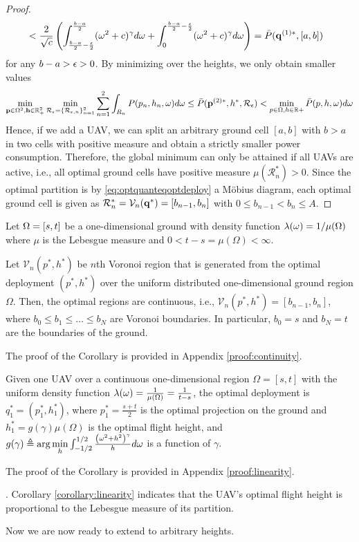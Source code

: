 \documentclass[smallabstract,smallcaptions]{dccpaper}
\newenvironment{remark}{\par\vspace{1.5ex}\noindent{\em Remark\/}.}{\par\vspace{1.5ex}}
\newcommand{\df}{\ensuremath{\lam}}         %
\newcommand{\Pbar}{\ensuremath{\bar{P}}}         %
\newcommand{\Vor}{\ensuremath{\mathcal{V}}}         %
\newcommand{\Rset}{\ensuremath{\mathcal R}}
\newcommand{\junstart}{\color{black}}
\newcommand{\junend}{\color{black}}
\begin{document}
\begin{proof}
\begin{align}
    &< \frac{2}{\sqrt{c}}\left( \int_{\frac{b-a}{2} -\frac{\eps}{2}}^{\frac{b-a}{2}} (\ome^2+c)^{\gam}d\ome
    +\int_{0}^{\frac{b-a}{2}-\frac{\eps}{2}} (\ome^2+c)^{\gam} d\ome\right)=\Pbar(\vq^{(1)*},[a,b])\notag
  \end{align}
  for any $b-a>\epsilon>0$. By minimizing over the heights, we only obtain smaller values
  \begin{align}
    \min_{ \vp\in\Ome^2, \vh\in\R_+^2} \min_{\Rset_{\eps}=\{\Rset_{\eps,n}\}_{n=1}^2}
    \sum_{n=1}^2 \int_{R_n} P(p_n,h_n,\ome)d\ome \leq
    \Pbar(\vp^{(2)*},h^*,\Rset_{\eps}) < \min_{p\in\Ome,h\in\R+} \Pbar(p,h,\ome)d\ome\notag
  \end{align}
  Hence, if we add a UAV, we can split an arbitrary ground cell $[a,b]$ with $b>a$ in two cells with positive measure
  and obtain a strictly smaller power consumption. Therefore, the global minimum can only be attained if all UAVs are
  active, i.e., all optimal ground cells have positive measure $\mu(\Rset^*_n)>0$. Since the optimal partition is by
  \eqref{eq:optquanteqoptdeploy} a Möbius diagram, each optimal ground cell is given as
  $\Rset^*_n=\Vor_n(\vq^*)=[b_{n-1},b_n]$ with $0 \leq b_{n-1}<b_n\leq A$. 
\end{proof}
\fi %
%
\junstart
%
Let $\Omega=[s,t]$ be a one-dimensional ground with density function $\df(\ome)=1/\mu(\Omega)$ where $\mu$ is the Lebesgue
measure and $0<t-s=\mu(\Omega)<\infty$.
%
\begin{corollary}
%
Let $\Vor_n(p^*, h^*)$ be $n$th Voronoi region that is generated from the optimal deployment $(p^*, h^*)$ over the
uniform distributed one-dimensional ground region $\Omega$. Then, the optimal regions are continuous, i.e., $\Vor_n(p^*,
h^*)=[b_{n-1}, b_n]$, where $b_0\le b_1 \le \dots\le b_N$ are Voronoi boundaries. In particular, $b_0 = s$ and $b_N = t$
are the boundaries of the ground.
\label{corollary:continuity}
\end{corollary}
The proof of the Corollary is provided in Appendix \ref{proof:continuity}.

\begin{corollary}
Given one UAV over a continuous one-dimensional region $\Omega=[s,t]$ with the uniform density function
$\lambda(\omega)=\frac{1}{\mu\left(\Omega\right)}=\frac{1}{t-s}$, the optimal deployment is $q^*_1=\left(p^*_1,
h^*_1\right)$, where $p^*_1=\frac{s+t}{2}$ is the optimal projection on the ground and
$h^*_1=g(\gamma)\mu\left(\Omega\right)$ is the optimal flight height, and
$g(\gamma)\triangleq\arg\min\limits_{h}\int_{-1/2}^{1/2} \frac{\left(\omega^2 + h^2\right)^{\gamma}}{h} d\omega$ is a function
of $\gamma$.
\label{corollary:linearity}
\end{corollary}
%
The proof of the Corollary is provided in Appendix \ref{proof:linearity}.
%
\begin{remark}
  Corollary \ref{corollary:linearity} indicates that the UAV's optimal flight height is proportional to the Lebesgue
  measure of its partition.
\end{remark}
\fi
%
\junend
Now we are now ready to extend  to arbitrary heights.
%
\end{document}

